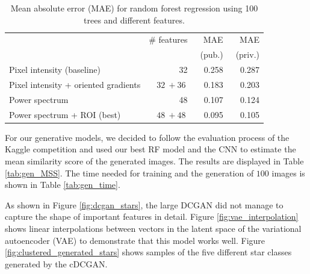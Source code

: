 \documentclass[10pt,conference,compsocconf]{IEEEtran}
\begin{document}
\begin{table}\centering
    \begin{tabular}{lrrr}
    \toprule
        & \# features & MAE & MAE \\
        & & ~(pub.) & ~(priv.) \\
    \midrule
        Pixel intensity (baseline) & \SI{32}{} & \SI{0.258}{} & \SI{0.287}{}  \\
        Pixel intensity + oriented gradients & $\SI{32}{} + \SI{36}{}$ & \SI{0.183}{} & \SI{0.203}{} \\
        Power spectrum & \SI{48}{} & \SI{0.107}{} & \SI{0.124}{} \\
        Power spectrum + ROI (best) & $\SI{48}{} + \SI{48}{}$ & \SI{0.095}{} & \SI{0.105}{} \\
    \bottomrule
    \end{tabular}
\caption{Mean absolute error (MAE) for random forest regression using 100 trees and different features.}
\label{tab:RF}
\end{table}




For our generative models, we decided to follow the evaluation process of the Kaggle competition and used our best RF model and the CNN to estimate the mean similarity score of the generated images. The results are displayed in Table \ref{tab:gen_MSS}. The time needed for training and the generation of $100$ images is shown in Table \ref{tab:gen_time}. 

As shown in Figure \ref{fig:dcgan_stars}, the large DCGAN did not manage to capture the shape of important features in detail. %
Figure \ref{fig:vae_interpolation} shows linear interpolations between vectors in the latent space of the variational autoencoder (VAE) to demonstrate that this model works well. Figure \ref{fig:clustered_generated_stars} shows samples of the five different star classes generated by the cDCGAN. %
\end{document}
